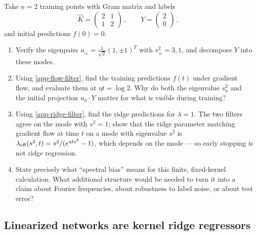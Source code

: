 \documentclass[11pt]{article}
\begin{document}
\begin{exercise}
\label{ex:app-filters}
Take $n=2$ training points with Gram matrix and labels
%
\begin{equation*}
    \hat K = \begin{pmatrix} 2 & 1 \\ 1 & 2\end{pmatrix}\,,\qquad Y = \begin{pmatrix} 2 \\ 0 \end{pmatrix}\,,
\end{equation*}
%
and initial predictions $f(0) = 0$.
\begin{enumerate}
  \item Verify the eigenpairs $u_\pm = \frac{1}{\sqrt2}(1,\pm 1)^T$ with $s_\pm^2 = 3, 1$, and decompose $Y$ into these modes.
  \item Using \eqref{app-flow-filter}, find the training predictions $f(t)$ under gradient flow, and evaluate them at $\eta t = \log 2$. Why do both the eigenvalue $s_a^2$ and the initial projection $u_a\cdot Y$ matter for what is visible during training?
  \item Using \eqref{app-ridge-filter}, find the ridge predictions for $\lambda = 1$. The two filters agree on the mode with $s^2 = 1$; show that the ridge parameter matching gradient flow at time $t$ on a mode with eigenvalue $s^2$ is $\lambda_{\rm eff}(s^2,t) = s^2/(e^{\eta t s^2}-1)$, which depends on the mode --- so early stopping is not ridge regression.
  \item State precisely what ``spectral bias'' means for this finite, fixed-kernel calculation. What additional structure would be needed to turn it into a claim about Fourier frequencies, about robustness to label noise, or about test error?
\end{enumerate}
\end{exercise}

\subsection{Linearized networks are kernel ridge regressors}
\label{app:linearized}
\end{document}
